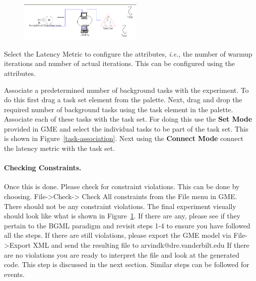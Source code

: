 \documentclass[onecolumn]{article}
\begin{document}
\begin{figure}[ht]
{
 \includegraphics[width=6cm]{BGML-Latency-Complete.png}
 \label{task-complete}
}
\end{figure}

\smallskip
{} Select the Latency Metric to configure the
attributes, {\em i.e.}, the number of warmup iterations and number of
actual iterations. This can be configured using the attributes.

\smallskip
{} Associate a predetermined number of background tasks
with the experiment. To do this first drag a task set element from the
palette. Next, drag and drop the required number of background tasks
using the task element in the palette. Associate each of these tasks
with the task set. For doing this use the {\bf Set Mode} provided in
GME and select the individual tasks to be part of the task set. This
is shown in Figure~\ref{task-association}. Next using the {\bf Connect Mode}
connect the latency metric with the task set.

\paragraph* {\bf Checking Constraints.}
Once this is done. Please check for constraint violations. This can be done by
choosing. File->Check-> Check All constraints from the File menu in GME. There
should not be any constraint violations. The final experiment visually should
look like what is shown in Figure~\ref{task-complete}. If there are any, please see if they
pertain to the BGML paradigm and revisit steps 1-4 to ensure you have followed
all the steps. If there are still violations, please export the GME model via
File->Export XML and send the resulting file to arvindk@dre.vanderbilt.edu If
there are no violations you are ready to interpret the file and look at the
generated code. This step is discussed in the next section. Similar steps can
be followed for events.
\end{document}
